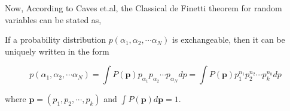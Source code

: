Now, According to Caves et.al\cite{chap16-key8}, the Classical de Finetti theorem for random variables can be stated as,

If a probability distribution $p(\alpha_{1}, \alpha_{2}, \cdots \alpha_{N})$ is exchangeable, then it can be uniquely written in the form

$$
p(\alpha_{1}, \alpha_{2}, \cdots \alpha_{N}) = \int P(\textbf{p}) p_{\alpha_{1}} p_{\alpha_{2}} \cdots p_{\alpha_{N}}  dp = \int P(\textbf{p}) p_{1}^{n_{1}} p_{2}^{n_{2}} \cdots p_{k}^{n_{k}} dp
$$ 

where $\textbf{p} = (p_{1}, p_{2}, \cdots, p_{k} )$ and $\int P(\textbf{p}) d\textbf{p} = 1$.




